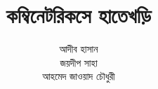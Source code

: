 \documentclass[a4paper, 12pt, oldfontcommands, final]{memoir}
\title{কম্বিনেটরিকসে হাতেখড়ি}
\author{আদীব হাসান\\
জয়দীপ সাহা\\
আহমেদ জাওয়াদ চৌধুরী}
\begin{document}
\frontmatter

\tableofcontents*

\mainmatter
\renewcommand\thesection{\thechapter.\tobangla{section}}
\renewcommand{\thepage}{\tobangla{page}}
\renewcommand{\thefigure}{\thechapter.\tobangla{figure}}


% 
% 

% 
% 
% 

\backmatter
\renewcommand{\thefigure}{\tobangla{figure}}
% 
\nocite{*}


\end{document}
